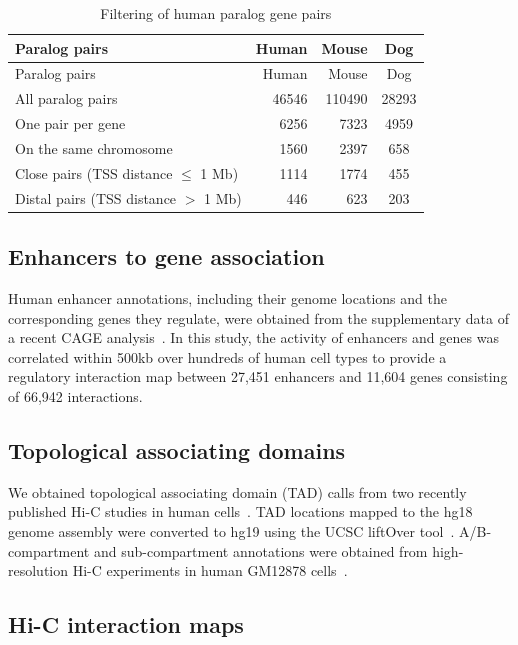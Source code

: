 \documentclass[a4paper,twoside=true,openright,parskip=full,chapterprefix=true,11pt,headings=normal,bibliography=totoc,listof=totoc,titlepage=on,captions=tableabove,draft=false]{scrreprt}
\theoremstyle{definition}
\theoremstyle{definition}
\theoremstyle{definition}
\theoremstyle{remark}
\begin{document}
\begin{longtable}[]{@{}lrrc@{}}
\caption{\label{tab:filter} Filtering of human paralog gene
pairs}\tabularnewline
\toprule
Paralog pairs & Human & Mouse & Dog\tabularnewline
\midrule
\endfirsthead
\toprule
Paralog pairs & Human & Mouse & Dog\tabularnewline
\midrule
\endhead
All paralog pairs & 46546 & 110490 & 28293\tabularnewline
One pair per gene & 6256 & 7323 & 4959\tabularnewline
On the same chromosome & 1560 & 2397 & 658\tabularnewline
Close pairs (TSS distance \(\leq\) 1 Mb) & 1114 & 1774 &
455\tabularnewline
Distal pairs (TSS distance \(>\) 1 Mb) & 446 & 623 & 203\tabularnewline
\bottomrule
\end{longtable}

\hypertarget{enhancers-to-gene-association}{%
\subsection{Enhancers to gene
association}\label{enhancers-to-gene-association}}

Human enhancer annotations, including their genome locations and the
corresponding genes they regulate, were obtained from the supplementary
data of a recent CAGE analysis~\citep{Andersson2014}. In this study, the
activity of enhancers and genes was correlated within 500kb over
hundreds of human cell types to provide a regulatory interaction map
between 27,451 enhancers and 11,604 genes consisting of 66,942
interactions.

\hypertarget{topological-associating-domains}{%
\subsection{Topological associating
domains}\label{topological-associating-domains}}

We obtained topological associating domain (TAD) calls from two recently
published Hi-C studies in human cells~\citep{Dixon2012, Rao2014}. TAD
locations mapped to the hg18 genome assembly were converted to hg19
using the UCSC liftOver tool~\citep{Hinrichs2006}. A/B-compartment and
sub-compartment annotations were obtained from high-resolution Hi-C
experiments in human GM12878 cells~\citep{Rao2014}.

\hypertarget{hi-c-interaction-maps}{%
\subsection{Hi-C interaction maps}\label{hi-c-interaction-maps}}
\end{document}
